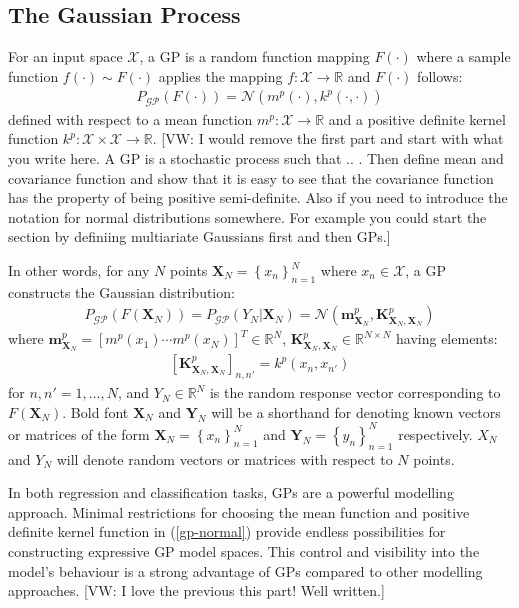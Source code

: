 \documentclass{article}
\newcommand{\vw}[1]{{\color{green} [VW: #1]}}
\newcommand{\GP}{\operatorname{\mathcal{GP}}}
\numberwithin{equation}{section}
\begin{document}
\subsection{The Gaussian Process}\label{section:the-gp}
For an input space $\mathcal{X}$, a GP is a random function mapping $F(\cdot)$ where a sample function $f(\cdot) \sim F(\cdot)$ applies the mapping $f: \mathcal{X} \rightarrow \mathbb{R}$ and $F(\cdot)$ follows:
\begin{align}
    P_{\GP}\left(F\left(\cdot \right)\right) =  \mathcal{N}(m^p(\cdot), k^p(\cdot, \cdot))
\end{align}
defined with respect to a mean function $m^p: \mathcal{X} \rightarrow \mathbb{R}$ and a positive definite kernel function $k^p: \mathcal{X} \times \mathcal{X} \rightarrow \mathbb{R}$. \vw{I would remove the first part and start with what you write here. A GP is a stochastic process such that .. . Then define mean and covariance function and show that it is easy to see that the covariance function has the property of being positive semi-definite. Also if you need to introduce the notation for normal distributions somewhere. For example you could start the section by definiing multiariate Gaussians first and then GPs.}


In other words, for any $N$ points $\mathbf{X}_N = \left\{ x_n\right\}_{n=1}^N$ where $x_n \in \mathcal{X}$, a GP constructs the Gaussian distribution:
\begin{align}
    P_{\GP}\left(F\left(\mathbf{X}_N\right)\right) = P_{\GP}\left(Y_N \vert \mathbf{X}_N\right) = \mathcal{N}\left(\mathbf{m}^p_{\mathbf{X}_N}, \mathbf{K}^{p}_{\mathbf{X}_N, \mathbf{X}_N}\right)
\end{align}
where $\mathbf{m}^p_{\mathbf{X}_N} = \left[ m^p(x_1) \cdots m^p(x_N)\right]^T \in \mathbb{R}^N$, $\mathbf{K}^p_{\mathbf{X}_N, \mathbf{X}_N} \in \mathbb{R}^{N \times N}$ having elements:
\begin{align}
    \left[\mathbf{K}^p_{\mathbf{X}_N, \mathbf{X}_N}\right]_{n, n'} = k^p(x_n, x_{n'})
\end{align}
for $n, n'=1,\dots, N$, and $Y_N \in \mathbb{R}^{N}$ is the random response vector corresponding to $F(\mathbf{X}_N)$. Bold font $\mathbf{X}_N$ and $\mathbf{Y}_N$ will be a shorthand for denoting known vectors or matrices of the form $\mathbf{X}_N = \left\{ x_n\right\}_{n=1}^N$ and $\mathbf{Y}_N = \left\{ y_n\right\}_{n=1}^N$ respectively. $X_N$ and $Y_N$ will denote random vectors or matrices with respect to $N$ points.

In both regression and classification tasks, GPs are a powerful modelling approach. Minimal restrictions for choosing the mean function and positive definite kernel function in (\ref{gp-normal}) provide endless possibilities for constructing expressive GP model spaces. This control and visibility into the model's behaviour is a strong advantage of GPs compared to other modelling approaches. \vw{I love the previous this part! Well written.}
\end{document}
